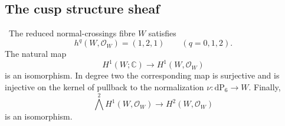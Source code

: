 

\subsection{The cusp structure sheaf}

\begin{lemma}
\label{lem:cusp-structure-sheaf-audit}
\Verified\ The reduced normal-crossings fibre \(W\) satisfies
\[
 h^q(W,\mathcal O_W)=(1,2,1)\qquad(q=0,1,2).
\tag{9.7}
\]
The natural map
\[
 H^1(W;\mathbb C)\longrightarrow H^1(W,\mathcal O_W)
\tag{9.8}
\]
is an isomorphism.  In degree two the corresponding map is surjective and
is injective on the kernel of pullback to the normalization
\(\nu:\mathrm{dP}_6\to W\).  Finally,
\[
 \bigwedge^2H^1(W,\mathcal O_W)
 \longrightarrow H^2(W,\mathcal O_W)
\tag{9.9}
\]
is an isomorphism.
\end{lemma}

